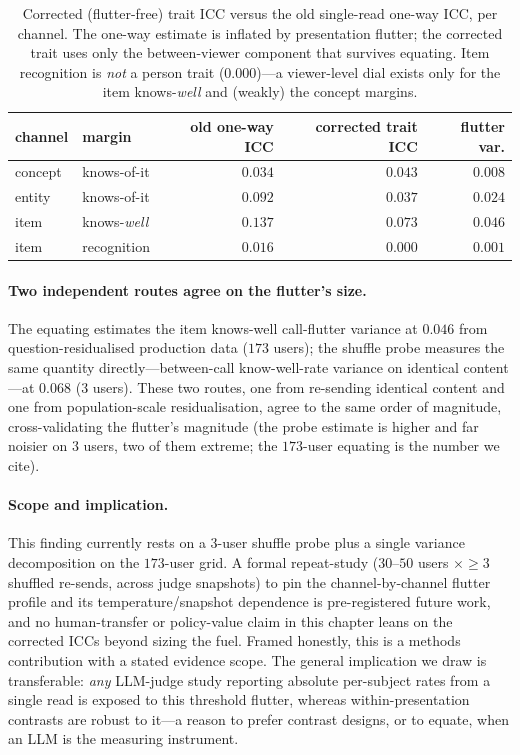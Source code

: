 \documentclass[11pt]{article}
\begin{document}
\begin{table}[h]\centering\small
\begin{tabular}{llrrr}
\toprule
channel & margin & old one-way ICC & corrected trait ICC & flutter var.\\
\midrule
concept & knows-of-it        & $0.034$ & $0.043$          & $0.008$\\
entity  & knows-of-it        & $0.092$ & $\mathbf{0.037}$ & $0.024$\\
item    & knows-\emph{well}  & $0.137$ & $\mathbf{0.073}$ & $0.046$\\
item    & recognition        & $0.016$ & $\mathbf{0.000}$ & $0.001$\\
\bottomrule
\end{tabular}
\caption{Corrected (flutter-free) trait ICC versus the old single-read one-way ICC, per channel. The one-way estimate
is inflated by presentation flutter; the corrected trait uses only the between-viewer component that survives equating.
Item recognition is \emph{not} a person trait ($0.000$)---a viewer-level dial exists only for the item
knows-\emph{well} and (weakly) the concept margins.}
\label{tab:fluttericc}
\end{table}

\paragraph{Two independent routes agree on the flutter's size.} The equating estimates the item knows-well call-flutter
variance at $0.046$ from question-residualised production data ($173$ users); the shuffle probe measures the same
quantity directly---between-call know-well-rate variance on identical content---at $0.068$ ($3$ users). These two
routes, one from re-sending identical content and one from population-scale residualisation, agree to the same order of
magnitude, cross-validating the flutter's magnitude (the probe estimate is higher and far noisier on $3$ users, two of
them extreme; the $173$-user equating is the number we cite).

\paragraph{Scope and implication.} This finding currently rests on a $3$-user shuffle probe plus a single variance
decomposition on the $173$-user grid. A formal repeat-study ($30$--$50$ users $\times\ge3$ shuffled re-sends, across
judge snapshots) to pin the channel-by-channel flutter profile and its temperature/snapshot dependence is
pre-registered future work, and no human-transfer or policy-value claim in this chapter leans on the corrected ICCs
beyond sizing the fuel. Framed honestly, this is a methods contribution with a stated evidence scope. The general
implication we draw is transferable: \emph{any} LLM-judge study reporting absolute per-subject rates from a single
read is exposed to this threshold flutter, whereas within-presentation contrasts are robust to it---a reason to prefer
contrast designs, or to equate, when an LLM is the measuring instrument.
\end{document}
